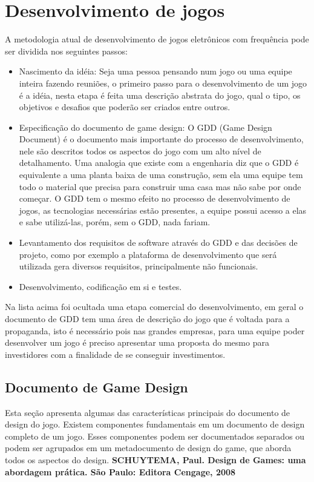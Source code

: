 \section{Desenvolvimento de jogos}
A metodologia atual de desenvolvimento de jogos eletrônicos com frequência pode ser dividida nos seguintes passos:
\begin{itemize}
\item Nascimento da idéia: Seja uma pessoa pensando num jogo ou uma equipe inteira fazendo reuniões, o primeiro passo para o desenvolvimento de um jogo é a idéia, nesta etapa é feita uma descrição abstrata do jogo, qual o tipo, os objetivos e desafios que poderão ser criados entre outros.
\item Especificação do documento de game design: O GDD (Game Design Document) é o documento mais importante do processo de desenvolvimento, nele são descritos todos os aspectos do jogo com um alto nível de detalhamento. Uma analogia que existe com a engenharia diz que o GDD é equivalente a uma planta baixa de uma construção, sem ela uma equipe tem todo o material que precisa para construir uma casa mas não sabe por onde começar. O GDD tem o mesmo efeito no processo de desenvolvimento de jogos, as tecnologias necessárias estão presentes, a equipe possui acesso a elas e sabe utilizá-las, porém, sem o GDD, nada fariam.
\item Levantamento dos requisitos de software através do GDD e das decisões de projeto, como por exemplo a plataforma de desenvolvimento que será utilizada gera diversos requisitos, principalmente não funcionais.
\item Desenvolvimento, codificação em si e testes.
\end{itemize}

Na lista acima foi ocultada uma etapa comercial do desenvolvimento, em geral o documento de GDD tem uma área de descrição do jogo que é voltada para a propaganda, isto é necessário pois nas grandes empresas, para uma equipe poder desenvolver um jogo é preciso apresentar uma proposta do mesmo para investidores com a finalidade de se conseguir investimentos.


\subsection{Documento de Game Design}
Esta seção apresenta algumas das características principais do documento de design do jogo. Existem componentes fundamentais em um documento de design completo de um jogo. Esses componentes podem ser documentados separados ou podem ser agrupados em um metadocumento de design do game, que aborda todos os aspectos do design. \textbf{SCHUYTEMA, Paul. Design de Games: uma abordagem prática. São Paulo: Editora Cengage, 2008}

